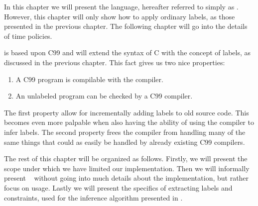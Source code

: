 
In this chapter we will present the \thelanglong{} language, hereafter referred to simply as \thelang.
However, this chapter will only show how to apply ordinary labels, as those presented in the previous chapter.
The following chapter will go into the details of time policies.

\thelang{} is based upon C99 and will extend the syntax of C with the concept of labels, as discussed in the previous chapter.
This fact gives us two nice properties:
\begin{enumerate}
  \item A C99 program is compilable with the \thelang{} compiler.
  \item An unlabeled \thelang{} program can be checked by a C99 compiler.
\end{enumerate}
The first property allow for incrementally adding labels to old source code.
This becomes even more palpable when also having the ability of using the \thelang{} compiler to infer labels.
The second property frees the \thelang{} compiler from handling many of the same things that could as easily be handled by already existing C99 compilers.

The rest of this chapter will be organized as follows.
Firstly, we will present the scope under which we have limited our implementation.
Then we will informally present \thelang~ without going into much details about the implementation, but rather focus on usage.
Lastly we will present the specifics of extracting labels and constraints, used for the inference algorithm presented in .

